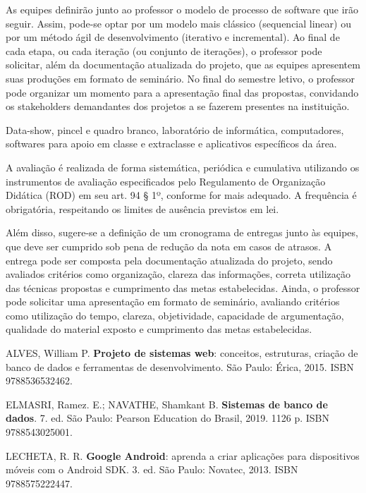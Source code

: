 \begin{pud}
	As equipes definirão junto ao professor o modelo de processo de software que irão
	seguir. Assim, pode-se optar por um modelo mais clássico (sequencial linear) ou por
	um método ágil de desenvolvimento (iterativo e incremental). Ao final de cada etapa,
	ou cada iteração (ou conjunto de iterações), o professor pode solicitar, além da
	documentação atualizada do projeto, que as equipes apresentem suas produções
	em formato de seminário. No final do semestre letivo, o professor pode organizar
	um momento para a apresentação final das propostas, convidando os stakeholders
	demandantes dos projetos a se fazerem presentes na instituição.
		
	\recursos
	Data-show, pincel e quadro branco, laboratório de informática, computadores, softwares para apoio em classe e extraclasse e aplicativos específicos da área.

	\avaliacao
	A avaliação é realizada de forma sistemática, periódica e cumulativa utilizando os
instrumentos de avaliação especificados pelo Regulamento de Organização
Didática (ROD) em seu art. 94 § 1º, conforme for mais adequado. A frequência é
obrigatória, respeitando os limites de ausência previstos em lei.
	\naopresencial

	Além disso, sugere-se a definição de um cronograma de entregas junto às equipes, que deve
ser cumprido sob pena de redução da nota em casos de atrasos. A entrega pode
ser composta pela documentação atualizada do projeto, sendo avaliados critérios
como organização, clareza das informações, correta utilização das técnicas
propostas e cumprimento das metas estabelecidas. Ainda, o professor pode solicitar
uma apresentação em formato de seminário, avaliando critérios como utilização do
tempo, clareza, objetividade, capacidade de argumentação, qualidade do material
exposto e cumprimento das metas estabelecidas.
	
	\begin{bibbasica}
		\item ALVES, William P. \textbf{Projeto de sistemas web}: conceitos, estruturas, criação de banco de dados e ferramentas de desenvolvimento. São Paulo: Érica, 2015. ISBN 9788536532462.
		\item ELMASRI, Ramez. E.; NAVATHE, Shamkant B. \textbf{Sistemas de banco de dados}. 7. ed. São Paulo: Pearson Education do Brasil, 2019. 1126 p. ISBN 9788543025001.
		\item LECHETA, R. R. \textbf{Google Android}: aprenda a criar aplicações para dispositivos móveis com o Android SDK. 3. ed. São Paulo: Novatec, 2013. ISBN 9788575222447.
	\end{bibbasica}
	

\end{pud}
